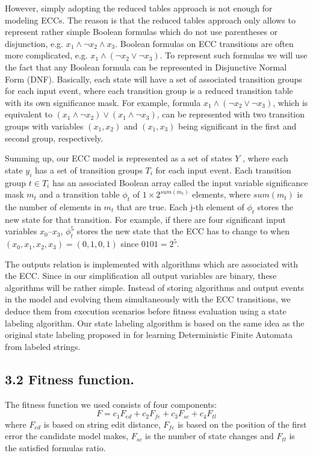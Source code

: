 \documentclass[fleqn,twocolumn]{article}
\begin{document}
However, simply adopting the reduced tables approach is not enough for modeling ECCs. The reason is that the reduced tables approach only allows to represent
rather simple Boolean formulas which do not use parentheses or disjunction, e.g. $x_1 \wedge \lnot x_2 \wedge x_3$. Boolean formulas on ECC transitions are
often more complicated, e.g. $x_1 \wedge (\lnot x_2 \vee \lnot x_3)$. To represent such formulas we will use the fact that any Boolean formula can be represented
in Disjunctive Normal Form (DNF). Basically, each state will have a set of associated transition groups for each input event, where each transition group is a
reduced transition table with its own significance mask. For example, formula $x_1 \wedge (\lnot x_2 \vee \lnot x_3)$, which is equivalent to 
$(x_1 \wedge \lnot x_2) \vee (x_1 \wedge \lnot x_3)$, can be represented with two transition groups with variables $(x_1, x_2)$ and $(x_1 , x_3)$ being significant
in the first and second group, respectively.

Summing up, our ECC model is represented as a set of states $Y$ , where each state $y_i$ has a set of transition groups $T_i$ for each input event.
Each transition group $t \in T_i$ has an associated Boolean array called the input variable significance mask $m_t$ and a transition table $\phi_t$ of $1 \times 2^{sum(m_t)}$
elements, where $sum(m_t)$ is the number of elements in $m_t$ that are true. Each j-th element of $\phi_t$ stores the new state for that transition. For example,
if there are four significant input variables $x_0–x_3$, $\phi_t^5$ stores the new state that the ECC has to change to when $(x_0, x_1, x_2, x_3) = (0, 1, 0, 1)$
since $0101 = 2^5$.

The outputs relation is implemented with algorithms which are associated with the ECC. Since in our simplification all output variables are binary,
these algorithms will be rather simple. Instead of storing algorithms and output events in the model and evolving them simultaneously with the ECC
transitions, we deduce them from execution scenarios before fitness evaluation using a state labeling algorithm. Our state labeling algorithm is based
on the same idea as the original state labeling proposed in \cite{ldfa} for learning Deterministic Finite Automata from labeled strings.

\subsection{3.2 Fitness function.}

The fitness function we used consists of four components:
$$
F = c_1F_{ed} + c_2F_{fe} + c_3F_{sc} + c_4F_{tl}
$$
where $F_{ed}$ is based on string edit distance, $F_{fe}$ is based on the position of the first error the candidate model makes, $F_{sc}$ is the number of state changes
and $F_{tl}$ is the satisfied formulas ratio.
\end{document}
